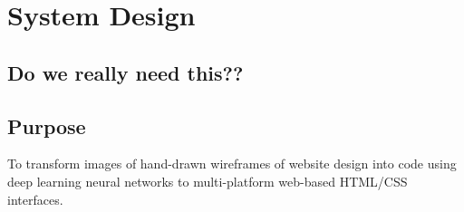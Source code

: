 
\chapter{System Design}
  \section{Do we really need this??}

  \section{Purpose}
    To transform images of hand-drawn wireframes of website design into code using deep learning neural networks to multi-platform web-based HTML/CSS interfaces.



